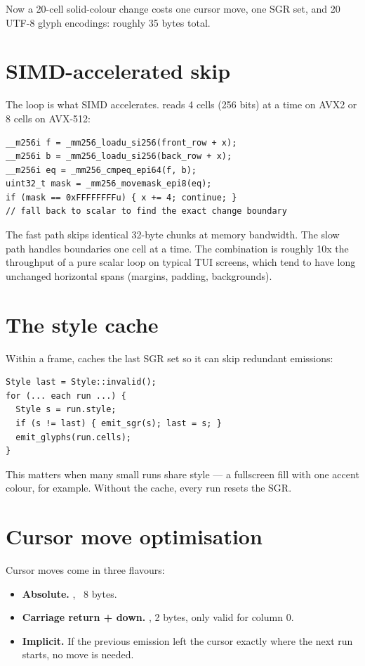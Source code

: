 Now a 20-cell solid-colour change costs one cursor move, one SGR
set, and 20 UTF-8 glyph encodings: roughly 35 bytes total.

\section{SIMD-accelerated skip}

The  loop is what SIMD
accelerates. \maya{} reads 4 cells (256 bits) at a time on AVX2 or
8 cells on AVX-512:

\begin{lstlisting}
__m256i f = _mm256_loadu_si256(front_row + x);
__m256i b = _mm256_loadu_si256(back_row + x);
__m256i eq = _mm256_cmpeq_epi64(f, b);
uint32_t mask = _mm256_movemask_epi8(eq);
if (mask == 0xFFFFFFFFu) { x += 4; continue; }
// fall back to scalar to find the exact change boundary
\end{lstlisting}

The fast path skips identical 32-byte chunks at memory bandwidth.
The slow path handles boundaries one cell at a time. The
combination is roughly 10x the throughput of a pure scalar loop on
typical TUI screens, which tend to have long unchanged horizontal
spans (margins, padding, backgrounds).

\section{The style cache}

Within a frame, \maya{} caches the last SGR set so it can skip
redundant emissions:

\begin{lstlisting}
Style last = Style::invalid();
for (... each run ...) {
  Style s = run.style;
  if (s != last) { emit_sgr(s); last = s; }
  emit_glyphs(run.cells);
}
\end{lstlisting}

This matters when many small runs share style --- a fullscreen
fill with one accent colour, for example. Without the cache, every
run resets the SGR.

\section{Cursor move optimisation}

Cursor moves come in three flavours:

\begin{itemize}[leftmargin=*]
  \item \textbf{Absolute.} \code{ESC [ y ; x H}, ~8 bytes.
  \item \textbf{Carriage return + down.} ,
    2 bytes, only valid for column 0.
  \item \textbf{Implicit.} If the previous emission left the
    cursor exactly where the next run starts, no move is needed.
\end{itemize}

